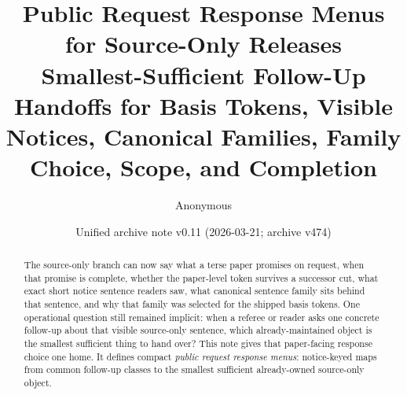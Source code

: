\documentclass[11pt]{article}
\title{Public Request Response Menus for Source-Only Releases\\\large Smallest-Sufficient Follow-Up Handoffs for Basis Tokens, Visible Notices, Canonical Families, Family Choice, Scope, and Completion}
\author{Anonymous}
\date{Unified archive note v0.11 (2026-03-21; archive v474)}
\begin{document}
\maketitle

\begin{abstract}
The source-only branch can now say what a terse paper promises on request, when that promise is complete, whether the paper-level token survives a successor cut, what exact short notice sentence readers saw, what canonical sentence family sits behind that sentence, and why that family was selected for the shipped basis tokens. One operational question still remained implicit: when a referee or reader asks one concrete follow-up about that visible source-only sentence, which already-maintained object is the smallest sufficient thing to hand over? This note gives that paper-facing response choice one home. It defines compact \emph{public request response menus}: notice-keyed maps from common follow-up classes to the smallest sufficient already-owned source-only object.
\end{abstract}
\end{document}
